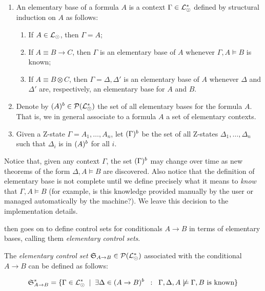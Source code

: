 \begin{definition}
  \begin{enumerate}
  \item An elementary base of a formula $A$ is a context
    $\Gamma \in \mathcal{L}_{\odot}^*$ defined by structural induction on $A$ as
    follows:

    \begin{enumerate}
    \item If $A \in \mathcal{L}_{\odot}$, then $\Gamma = A$;
    \item If $A \equiv B \rightarrow C$, then $\Gamma$ is an elementary base of
      $A$ whenever $\Gamma, A \models B$ is known;
    \item If $A \equiv B \otimes C$, then $\Gamma = \Delta, \Delta'$ is an
      elementary base of $A$ whenever $\Delta$ and $\Delta'$ are, respectively,
      an elementary base for $A$ and $B$.
    \end{enumerate}

  \item Denote by $(A)^{b} \in \mathcal{P}(\mathcal{L}_{\odot}^*)$ the set of all
    elementary bases for the formula $A$. That is, we in general associate to a
    formula $A$ a set of elementary contexts.
  \item Given a Z-state $\Gamma = A_1, \dots, A_n$, let $(\Gamma)^{b}$ be
    the set of all Z-states $\Delta_1, \dots, \Delta_n$ such that $\Delta_i$ is
    in $(A)^{b}$ for all $i$.
  \end{enumerate}
\end{definition}

Notice that, given any context $\Gamma$, the set $(\Gamma)^{b}$ may change
over time as new theorems of the form $\Delta, A \models B$ are discovered.
Also notice that the definition of elementary base is not complete until we
define precisely what it means to \emph{know} that $\Gamma, A \models B$ (for
example, is this knowledge provided manually by the user or managed
automatically by the machine?). We leave this decision to the implementation
details.

\cite{adding-logic} then goes on to define control sets for conditionals
$A \rightarrow B$ in terms of elementary bases, calling them \emph{elementary
  control sets}.

\begin{definition}
  The \emph{elementary control set}
  $\mathfrak{S}_{A \rightarrow B} \in \mathcal{P}(\mathcal{L}_{\odot}^*)$ associated with
  the conditional $A \rightarrow B$ can be defined as follows:

  \[
    \mathfrak{S}_{A \rightarrow B}^* = \{
    \Gamma \in \mathcal{L}_{\odot}^* \;\; | \;\; \exists \Delta \in (A \rightarrow
    B)^{b}
    \;\; : \;\; \Gamma, \Delta, A \not \models \Gamma, B \text{ is known}
    \}
  \]
\end{definition}

